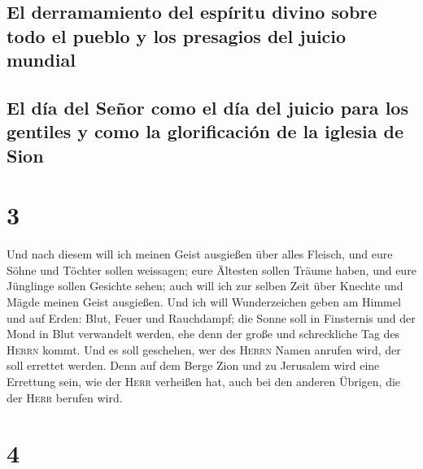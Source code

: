 \hypertarget{el-derramamiento-del-espuxedritu-divino-sobre-todo-el-pueblo-y-los-presagios-del-juicio-mundial}{%
\subsection{El derramamiento del espíritu divino sobre todo el pueblo y
los presagios del juicio
mundial}\label{el-derramamiento-del-espuxedritu-divino-sobre-todo-el-pueblo-y-los-presagios-del-juicio-mundial}}

\hypertarget{el-duxeda-del-seuxf1or-como-el-duxeda-del-juicio-para-los-gentiles-y-como-la-glorificaciuxf3n-de-la-iglesia-de-sion}{%
\subsection{El día del Señor como el día del juicio para los gentiles y
como la glorificación de la iglesia de
Sion}\label{el-duxeda-del-seuxf1or-como-el-duxeda-del-juicio-para-los-gentiles-y-como-la-glorificaciuxf3n-de-la-iglesia-de-sion}}

\hypertarget{section-2}{%
\section{3}\label{section-2}}

 Und nach diesem will ich meinen Geist ausgießen über
alles Fleisch, und eure Söhne und Töchter sollen weissagen; eure
Ältesten sollen Träume haben, und eure Jünglinge sollen Gesichte sehen;
 auch will ich zur selben Zeit über Knechte und Mägde
meinen Geist ausgießen.  Und ich will Wunderzeichen geben
am Himmel und auf Erden: Blut, Feuer und Rauchdampf;  die
Sonne soll in Finsternis und der Mond in Blut verwandelt werden, ehe
denn der große und schreckliche Tag des \textsc{Herrn} kommt.
 Und es soll geschehen, wer des \textsc{Herrn} Namen
anrufen wird, der soll errettet werden. Denn auf dem Berge Zion und zu
Jerusalem wird eine Errettung sein, wie der \textsc{Herr} verheißen hat,
auch bei den anderen Übrigen, die der \textsc{Herr} berufen wird.

\hypertarget{section-3}{%
\section{4}\label{section-3}}

